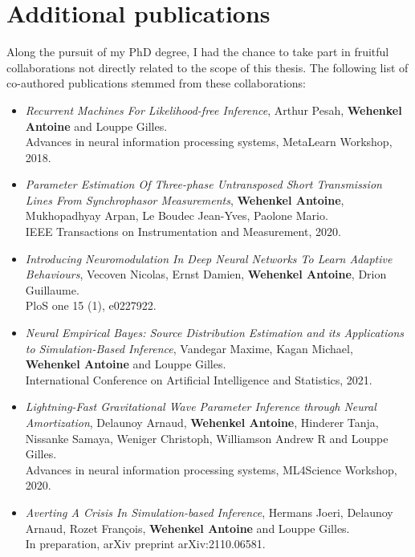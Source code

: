 \section{Additional publications}

Along the pursuit of my PhD degree, I had the chance to take part in fruitful collaborations not directly related to the scope of this thesis.
The following list of co-authored publications stemmed from these collaborations:
\begin{itemize}
\item[] \citep{pesah2018recurrent} \textit{Recurrent Machines For Likelihood-free Inference},
Arthur Pesah, \textbf{Wehenkel Antoine} and Louppe Gilles.\\
Advances in neural information processing systems, MetaLearn Workshop, 2018.

\item[] \citep{wehenkel2020parameter} \textit{Parameter Estimation Of Three-phase Untransposed Short Transmission Lines From Synchrophasor Measurements},
\textbf{Wehenkel Antoine}, Mukhopadhyay Arpan, Le Boudec Jean-Yves, Paolone Mario.\\
IEEE Transactions on Instrumentation and Measurement, 2020.

\item[] \citep{vecoven2020introducing} \textit{Introducing Neuromodulation In Deep Neural Networks To Learn Adaptive Behaviours},
Vecoven Nicolas, Ernst Damien, \textbf{Wehenkel Antoine}, Drion Guillaume.\\
PloS one 15 (1), e0227922.

\item[] \citep{vandegar2021neural} \textit{Neural Empirical Bayes: Source Distribution Estimation and its Applications to Simulation-Based Inference},
Vandegar Maxime, Kagan Michael, \textbf{Wehenkel Antoine} and Louppe Gilles.\\
International Conference on Artificial Intelligence and Statistics, 2021.

\item[] \citep{delaunoy2020lightning} \textit{Lightning-Fast Gravitational Wave Parameter Inference through Neural Amortization},
Delaunoy Arnaud, \textbf{Wehenkel Antoine}, Hinderer Tanja, Nissanke Samaya, Weniger Christoph, Williamson Andrew R and Louppe Gilles.\\
Advances in neural information processing systems, ML4Science Workshop, 2020.

\item[] \citep{hermans2021averting} \textit{Averting A Crisis In Simulation-based Inference},
Hermans Joeri, Delaunoy Arnaud, Rozet Fran{\c{c}}ois, \textbf{Wehenkel Antoine} and Louppe Gilles.\\
In preparation, arXiv preprint arXiv:2110.06581.


\end{itemize}
